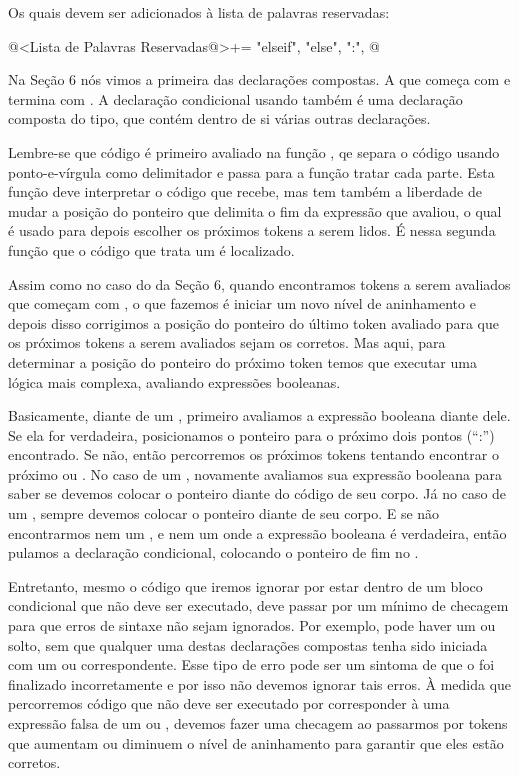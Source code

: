 {{{{{{Os quais devem ser adicionados à lista de palavras reservadas:

\iniciocodigo
@<Lista de Palavras Reservadas@>+=
"elseif", "else", ":",
@
\fimcodigo

Na Seção 6 nós vimos a primeira das declarações compostas. A que
começa com  e termina
com . A declaração condicional
usando  também é uma declaração composta do tipo, que
contém dentro de si várias outras declarações.

Lembre-se que código é primeiro avaliado na
função , qe separa o código
usando ponto-e-vírgula como delimitador e passa para a
função  tratar cada parte. Esta função
deve interpretar o código que recebe, mas tem também a liberdade de
mudar a posição do ponteiro que delimita o fim da expressão que
avaliou, o qual é usado para depois escolher os próximos tokens a
serem lidos. É nessa segunda função que o código que trata
um  é localizado.

Assim como no caso do  da Seção 6,
quando encontramos tokens a serem avaliados que começam
com , o que fazemos é iniciar um novo nível de
aninhamento e depois disso corrigimos a posição do ponteiro do último
token avaliado para que os próximos tokens a serem avaliados sejam os
corretos. Mas aqui, para determinar a posição do ponteiro do próximo
token temos que executar uma lógica mais complexa, avaliando
expressões booleanas.

Basicamente, diante de um , primeiro avaliamos a
expressão booleana diante dele. Se ela for verdadeira, posicionamos o
ponteiro para o próximo dois pontos (``:'') encontrado. Se não, então
percorremos os próximos tokens tentando encontrar o
próximo  ou . No caso de
um , novamente avaliamos sua expressão booleana
para saber se devemos colocar o ponteiro diante do código de seu
corpo. Já no caso de um , sempre devemos colocar o
ponteiro diante de seu corpo. E se não encontrarmos nem
um , e nem um  onde a expressão
booleana é verdadeira, então pulamos a declaração condicional,
colocando o ponteiro de fim no .

Entretanto, mesmo o código que iremos ignorar por estar dentro de um
bloco condicional que não deve ser executado, deve passar por um
mínimo de checagem para que erros de sintaxe não sejam ignorados. Por
exemplo, pode haver um  ou 
solto, sem que qualquer uma destas declarações compostas tenha sido
iniciada com um  ou 
correspondente. Esse tipo de erro pode ser um sintoma de que
o  foi finalizado incorretamente e por isso não devemos
ignorar tais erros. À medida que percorremos código que não deve ser
executado por corresponder à uma expressão falsa de um 
ou , devemos fazer uma checagem ao passarmos por
tokens que aumentam ou diminuem o nível de aninhamento para garantir
que eles estão corretos.

}}}}}}

